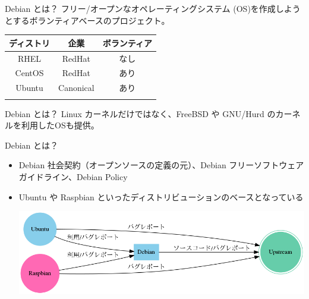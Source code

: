 \begin{frame}{Debian とは？}
フリー/オープンなオペレーティングシステム (OS)を作成しようとするボランティアベースのプロジェクト。

\begin{table}[htb]
  \begin{tabular}{|c|c|c|}
    \hline
    ディストリ & 企業 & ボランティア \\ \hline
    RHEL & RedHat & なし  \\ \hline
    CentOS & RedHat & あり \\ \hline
    Ubuntu  & Canonical & あり \\ \hline
    \color{red}{Debian}  & \color{red}{なし} & \color{red}{あり} \\ \hline
  \end{tabular}
\end{table}

\end{frame}

\begin{frame}{Debian とは？}
Linux カーネルだけではなく、FreeBSD や GNU/Hurd のカーネルを利用したOSも提供。

 \begin{center}
 \end{center}

\end{frame}

\begin{frame}{Debian とは？}
\begin{itemize}[<+->]
\item Debian 社会契約（オープンソースの定義の元）、Debian フリーソフトウェアガイドライン、Debian Policy
\item Ubuntu や Raspbian といったディストリビューションのベースとなっている
 \begin{center} 
 \includegraphics[width=0.8\hsize]{image201605/debian_derivatives.png}
 \end{center} 
\end{itemize}
\end{frame}

